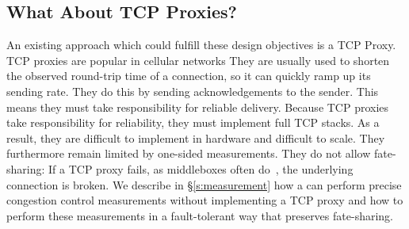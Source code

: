 \subsection{What About TCP Proxies?}\label{s:design:prior}
\begin{outline}
\1 An existing approach which could fulfill these design objectives is a TCP Proxy.
    \2 TCP proxies are popular in cellular networks
    \2 They are usually used to shorten the observed round-trip time of a connection, so it can quickly ramp up its sending rate.
    \2 They do this by sending acknowledgements to the sender.  
        \3 This means they must take responsibility for reliable delivery.
    \2 Because TCP proxies take responsibility for reliability, they must implement full TCP stacks.
        \3 As a result, they are difficult to implement in hardware and difficult to scale. 
    \2 They furthermore remain limited by one-sided measurements.
    \2 They do not allow fate-sharing:
        \3 If a TCP proxy fails, as middleboxes often do~\cite{aplomb}, the underlying connection is broken.
\1 We describe in \S\ref{s:measurement} how a \name can perform precise congestion control measurements without implementing a TCP proxy
    \2 and how to perform these measurements in a fault-tolerant way that preserves fate-sharing.
\end{outline}

